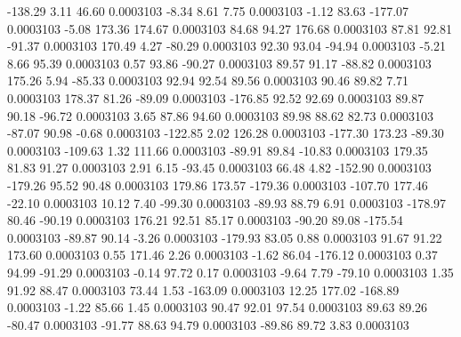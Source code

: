      -138.29        3.11       46.60     0.0003103
       -8.34        8.61        7.75     0.0003103
       -1.12       83.63     -177.07     0.0003103
       -5.08      173.36      174.67     0.0003103
       84.68       94.27      176.68     0.0003103
       87.81       92.81      -91.37     0.0003103
      170.49        4.27      -80.29     0.0003103
       92.30       93.04      -94.94     0.0003103
       -5.21        8.66       95.39     0.0003103
        0.57       93.86      -90.27     0.0003103
       89.57       91.17      -88.82     0.0003103
      175.26        5.94      -85.33     0.0003103
       92.94       92.54       89.56     0.0003103
       90.46       89.82        7.71     0.0003103
      178.37       81.26      -89.09     0.0003103
     -176.85       92.52       92.69     0.0003103
       89.87       90.18      -96.72     0.0003103
        3.65       87.86       94.60     0.0003103
       89.98       88.62       82.73     0.0003103
      -87.07       90.98       -0.68     0.0003103
     -122.85        2.02      126.28     0.0003103
     -177.30      173.23      -89.30     0.0003103
     -109.63        1.32      111.66     0.0003103
      -89.91       89.84      -10.83     0.0003103
      179.35       81.83       91.27     0.0003103
        2.91        6.15      -93.45     0.0003103
       66.48        4.82     -152.90     0.0003103
     -179.26       95.52       90.48     0.0003103
      179.86      173.57     -179.36     0.0003103
     -107.70      177.46      -22.10     0.0003103
       10.12        7.40      -99.30     0.0003103
      -89.93       88.79        6.91     0.0003103
     -178.97       80.46      -90.19     0.0003103
      176.21       92.51       85.17     0.0003103
      -90.20       89.08     -175.54     0.0003103
      -89.87       90.14       -3.26     0.0003103
     -179.93       83.05        0.88     0.0003103
       91.67       91.22      173.60     0.0003103
        0.55      171.46        2.26     0.0003103
       -1.62       86.04     -176.12     0.0003103
        0.37       94.99      -91.29     0.0003103
       -0.14       97.72        0.17     0.0003103
       -9.64        7.79      -79.10     0.0003103
        1.35       91.92       88.47     0.0003103
       73.44        1.53     -163.09     0.0003103
       12.25      177.02     -168.89     0.0003103
       -1.22       85.66        1.45     0.0003103
       90.47       92.01       97.54     0.0003103
       89.63       89.26      -80.47     0.0003103
      -91.77       88.63       94.79     0.0003103
      -89.86       89.72        3.83     0.0003103
